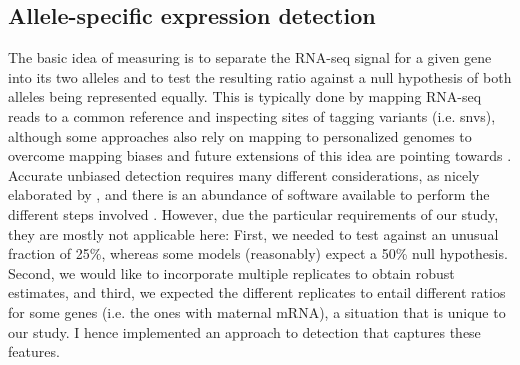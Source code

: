 \subsection{Allele-specific expression detection}
\label{sec:balancer_ase_impl}

The basic idea of measuring \ase is to separate the RNA-seq signal for a given
gene into its two alleles and to test the resulting ratio against a null
hypothesis of both alleles being represented equally. This is typically done by
mapping RNA-seq reads to a common reference and inspecting sites of tagging
variants (i.e. \acp{snv}), although some approaches also rely on mapping to
personalized genomes to overcome mapping biases \citep{Rozowsky2014} and future
extensions of this idea are pointing towards 
\citep{Dilthey2015,Marschall2016,Novak101378}. Accurate unbiased \ase detection
requires many different considerations, as nicely elaborated by \citet{Castel2015},
and there is an abundance of software available to perform the different steps
involved \citep{Skelly2011,Mayba2014,Harvey2014,Pirinen2015,Romanel2015,VandeGeijn2015,Liu2016}.
However, due the particular requirements of our study, they are mostly not
applicable here: First, we needed to test \ase against an unusual fraction of 25\%,
whereas some models (reasonably) expect a 50\% null hypothesis. Second, we
would like to incorporate multiple replicates to obtain robust estimates, and third,
we expected the different replicates to entail different \ase ratios for some
genes (i.e. the ones with maternal mRNA), a situation that is unique to our
study. I hence implemented an approach to \ase detection that captures these
features.

